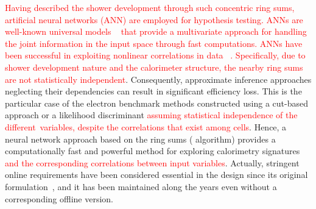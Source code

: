 \textcolor{red}{Having described the shower development through such concentric ring sums,  artificial neural networks (ANN) are employed for hypothesis testing.  ANNs are well-known universal models ~\cite{haykin_2008} that provide a multivariate approach for handling the joint information in the input space through fast computations.  ANNs have been successful in exploiting nonlinear correlations in data \textcolor{red}{~\cite{Duda}}. Specifically, due to shower development nature and the calorimeter structure, the nearby ring sums are not statistically independent}. Consequently, approximate inference approaches neglecting their dependencies can result in significant efficiency loss. This is the particular case of the electron benchmark methods constructed using a cut-based approach or a likelihood discriminant \textcolor{red}{assuming statistical independence of the different variables, despite the correlations that exist among cells}.  Hence, a neural network approach based on the ring sums (\rnn{} algorithm) provides a computationally fast and powerful method for exploring calorimetry signatures \textcolor{red}{and the corresponding correlations between input variables}. Actually, stringent online requirements have been considered essential in the \rnn{} design since its original formulation~\cite{1995_seixas_ringer}, and it has been maintained along the years even without a corresponding offline version.





